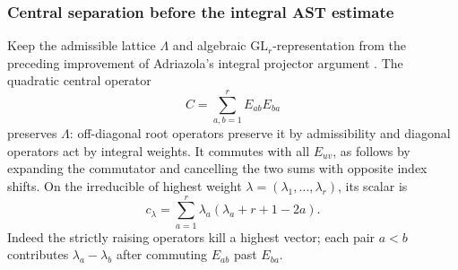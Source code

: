 \subsubsection{Central separation before the integral AST estimate}
\label{sec:adriazola-projector-clusters}
Keep the admissible lattice \(\Lambda\) and algebraic
\(\mathrm{GL}_r\)-representation from the preceding improvement of
Adriazola's integral projector argument \cite{adriazola-reconstruction}.
The quadratic central operator
\[
 C=\sum_{a,b=1}^r E_{ab}E_{ba}
\]
preserves \(\Lambda\): off-diagonal root operators preserve it
by admissibility and diagonal operators act by integral weights.
It commutes with all \(E_{uv}\), as follows by expanding the
commutator and cancelling the two sums with opposite index shifts.
On the irreducible of highest weight
\(\lambda=(\lambda_1,\ldots,\lambda_r)\), its scalar is
\[
 c_\lambda=\sum_{a=1}^r\lambda_a(\lambda_a+r+1-2a).
\]
Indeed the strictly raising operators kill a highest vector;
each pair \(a<b\) contributes \(\lambda_a-\lambda_b\)
after commuting \(E_{ab}\) past \(E_{ba}\).

